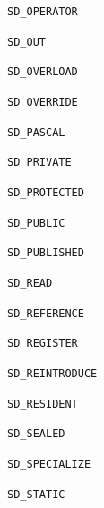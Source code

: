 \documentclass{report}
\begin{document}
\begin{list}{}
\begin{description}
\item[\texttt{SD{\_}OPERATOR}] \label{PasDoc_Tokenizer-SD_OPERATOR}
\index{}
 
\item[\texttt{SD{\_}OUT}] \label{PasDoc_Tokenizer-SD_OUT}
\index{}
 
\item[\texttt{SD{\_}OVERLOAD}] \label{PasDoc_Tokenizer-SD_OVERLOAD}
\index{}
 
\item[\texttt{SD{\_}OVERRIDE}] \label{PasDoc_Tokenizer-SD_OVERRIDE}
\index{}
 
\item[\texttt{SD{\_}PASCAL}] \label{PasDoc_Tokenizer-SD_PASCAL}
\index{}
 
\item[\texttt{SD{\_}PRIVATE}] \label{PasDoc_Tokenizer-SD_PRIVATE}
\index{}
 
\item[\texttt{SD{\_}PROTECTED}] \label{PasDoc_Tokenizer-SD_PROTECTED}
\index{}
 
\item[\texttt{SD{\_}PUBLIC}] \label{PasDoc_Tokenizer-SD_PUBLIC}
\index{}
 
\item[\texttt{SD{\_}PUBLISHED}] \label{PasDoc_Tokenizer-SD_PUBLISHED}
\index{}
 
\item[\texttt{SD{\_}READ}] \label{PasDoc_Tokenizer-SD_READ}
\index{}
 
\item[\texttt{SD{\_}REFERENCE}] \label{PasDoc_Tokenizer-SD_REFERENCE}
\index{}
 
\item[\texttt{SD{\_}REGISTER}] \label{PasDoc_Tokenizer-SD_REGISTER}
\index{}
 
\item[\texttt{SD{\_}REINTRODUCE}] \label{PasDoc_Tokenizer-SD_REINTRODUCE}
\index{}
 
\item[\texttt{SD{\_}RESIDENT}] \label{PasDoc_Tokenizer-SD_RESIDENT}
\index{}
 
\item[\texttt{SD{\_}SEALED}] \label{PasDoc_Tokenizer-SD_SEALED}
\index{}
 
\item[\texttt{SD{\_}SPECIALIZE}] \label{PasDoc_Tokenizer-SD_SPECIALIZE}
\index{}
 
\item[\texttt{SD{\_}STATIC}] \label{PasDoc_Tokenizer-SD_STATIC}
\index{}
 

\end{description}
\end{list}
\end{document}

